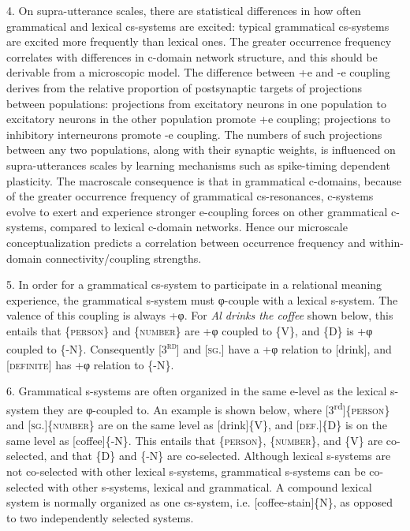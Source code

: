 4. On supra-utterance scales, there are statistical differences in how often grammatical and lexical cs-systems are excited: typical grammatical cs-systems are excited more frequently than lexical ones. The greater occurrence frequency correlates with differences in c-domain network structure, and this should be derivable from a microscopic model. The difference between +e and -e coupling derives from the relative proportion of postsynaptic targets of projections between populations: projections from excitatory neurons in one population to excitatory neurons in the other population promote +e coupling; projections to inhibitory interneurons promote -e coupling. The numbers of such projections between any two populations, along with their synaptic weights, is influenced on supra-utterances scales by learning mechanisms such as spike-timing dependent plasticity. The macroscale consequence is that in grammatical c-domains, because of the greater occurrence frequency of grammatical cs-resonances, c-systems evolve to exert and experience stronger e-coupling forces on other grammatical c-systems, compared to lexical c-domain networks. Hence our microscale conceptualization predicts a correlation between occurrence frequency and within-domain connectivity/coupling strengths.

5. In order for a grammatical cs-system to participate in a relational meaning experience, the grammatical s-system must φ-couple with a lexical s-system. The valence of this coupling is always +φ. For \textit{Al drinks the coffee} shown below, this entails that \{\textsc{person}\} and \{\textsc{number}\} are +φ coupled to \{V\}, and \{D\} is +φ coupled to \{-N\}. Consequently [\textsc{3}\textsc{\textsuperscript{rd}}] and [\textsc{sg}.] have a +φ relation to [drink], and [\textsc{definite}] has +φ relation to \{-N\}.

6. Grammatical s-systems are often organized in the same e-level as the lexical s-system they are φ-coupled to. An example is shown below, where [3\textsuperscript{rd}]\{\textsc{person}\} and [\textsc{sg.}]\{\textsc{number}\} are on the same level as [drink]\{V\}, and [\textsc{def}.]\{D\} is on the same level as [coffee]\{-N\}. This entails that \{\textsc{person}\}, \{\textsc{number}\}, and \{V\} are co-selected, and that \{D\} and \{-N\} are co-selected. Although lexical s-systems are not co-selected with other lexical s-systems, grammatical s-systems can be co-selected with other s-systems, lexical and grammatical. A compound lexical system is normally organized as one cs-system, i.e. [coffee-stain]\{N\}, as opposed to two independently selected systems.

